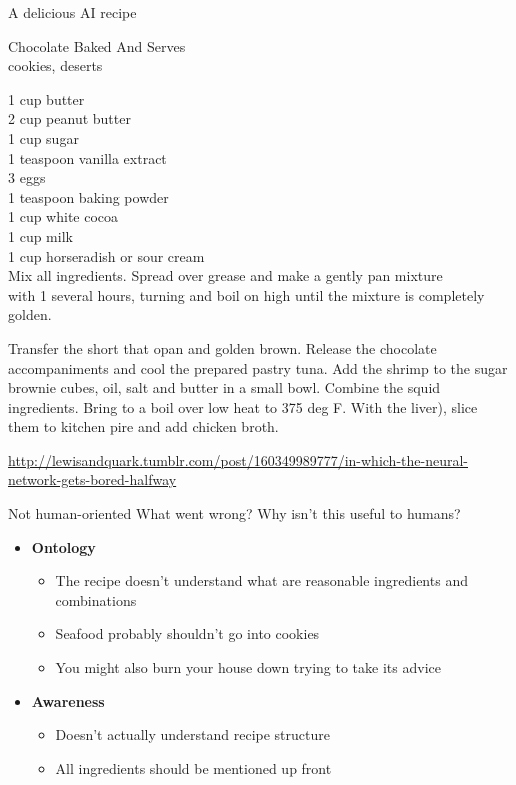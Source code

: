 \documentclass[10pt, compress]{beamer}
\begin{document}
\begin{frame}{A delicious AI recipe}

	\footnotesize
	Chocolate Baked And Serves	\\
	cookies, deserts

	1 cup butter	\\
	2 cup peanut butter	\\
	1 cup sugar \\
	1 teaspoon vanilla extract	\\
	3  eggs \\
	1 teaspoon baking powder \\
	1 cup white cocoa \\
	1 cup milk \\
	1 cup horseradish or sour cream \\

	Mix all ingredients.  Spread over grease and make a gently pan mixture \\
	with 1 several hours, turning and boil on high until the mixture is completely golden.

	Transfer the short that opan and golden brown. Release the chocolate
	accompaniments and cool the prepared pastry tuna. Add the shrimp to the sugar brownie cubes, oil, salt and butter in a small bowl. Combine the squid ingredients. Bring to a boil over low heat to 375 deg F. With the liver), slice them to kitchen pire and add chicken broth.

	{\tiny \href{http://lewisandquark.tumblr.com/post/160349989777/in-which-the-neural-network-gets-bored-halfway}{http://lewisandquark.tumblr.com/post/160349989777/in-which-the-neural-network-gets-bored-halfway}}
\end{frame}

\begin{frame}{Not human-oriented}
	What went wrong? Why isn't this useful to humans? \pause

	\begin{itemize}
		\item<1->	\textbf{Ontology}
		\begin{itemize}
			\item<2-> The recipe doesn't understand what are reasonable ingredients and combinations 
			\item<3-> Seafood probably shouldn't go into cookies
			\item<4-> You might also burn your house down trying to take its advice
		\end{itemize}

		\item<1->	\textbf{Awareness}
		\begin{itemize}
			\item<5-> Doesn't actually understand recipe structure
			\item<6-> All ingredients should be mentioned up front
		\end{itemize}
	\end{itemize}
\end{frame}
\end{document}
